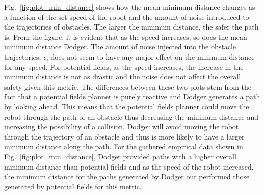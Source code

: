 Fig.~\ref{fig:plot_min_distance} shows how the mean minimum distance changes as
a function of the set speed of the robot and the amount of noise introduced to
the trajectories of obstacles. The larger the minimum distance, the safer the
path is. From the figure, it is evident that as the speed increases, so does
the mean minimum distance Dodger. The amount of noise injected into the
obstacle trajectories, $\epsilon$, does not seem to have any major effect on
the minimum distance for any speed. For potential fields, as the speed
increases, the increase in the minimum distance is not as drastic and the noise
does not affect the overall safety given this metric. The differences between
these two plots stem from the fact that a potential fields planner is purely
reactive and Dodger generates a path by looking ahead. This means that the
potential fields planner could move the robot through the path of an obstacle
thus decreasing the minimum distance and increasing the possibility of a
collision. Dodger will avoid moving the robot through the trajectory of an
obstacle and thus is more likely to have a larger minimum distance along the
path. For the gathered empirical data shown in
Fig.~\ref{fig:plot_min_distance}, Dodger provided paths with a higher overall
minimum distance than potential fields and as the speed of the robot increased,
the minimum distance for the paths generated by Dodger out performed those
generated by potential fields for this metric.

